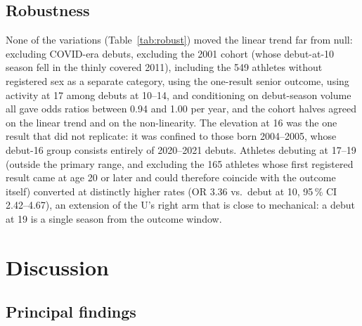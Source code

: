 \documentclass[12pt,a4paper]{article}
\begin{document}
\subsection{Robustness}

None of the variations (Table~\ref{tab:robust}) moved the linear trend far from null: excluding COVID-era debuts, excluding the 2001 cohort (whose debut-at-10 season fell in the thinly covered 2011), including the 549 athletes without registered sex as a separate category, using the one-result senior outcome, using activity at 17 among debuts at 10--14, and conditioning on debut-season volume all gave odds ratios between 0.94 and 1.00 per year, and the cohort halves agreed on the linear trend and on the non-linearity. The elevation at 16 was the one result that did not replicate: it was confined to those born 2004--2005, whose debut-16 group consists entirely of 2020--2021 debuts. Athletes debuting at 17--19 (outside the primary range, and excluding the 165 athletes whose first registered result came at age 20 or later and could therefore coincide with the outcome itself) converted at distinctly higher rates (OR 3.36 vs.\ debut at 10, 95\,\% CI 2.42--4.67), an extension of the U's right arm that is close to mechanical: a debut at 19 is a single season from the outcome window.

\begin{table}[H]
\centering
\caption{Robustness analyses. Estimates are for debut age (per +1 year, linear) unless stated; outcome is senior activity unless stated. Abbreviations: CI, confidence interval; COVID-19, coronavirus disease 2019; OR, odds ratio; SE, standard error.}
\label{tab:robust}
\small

\end{table}

\FloatBarrier

\section{Discussion}

\subsection{Principal findings}
\end{document}
